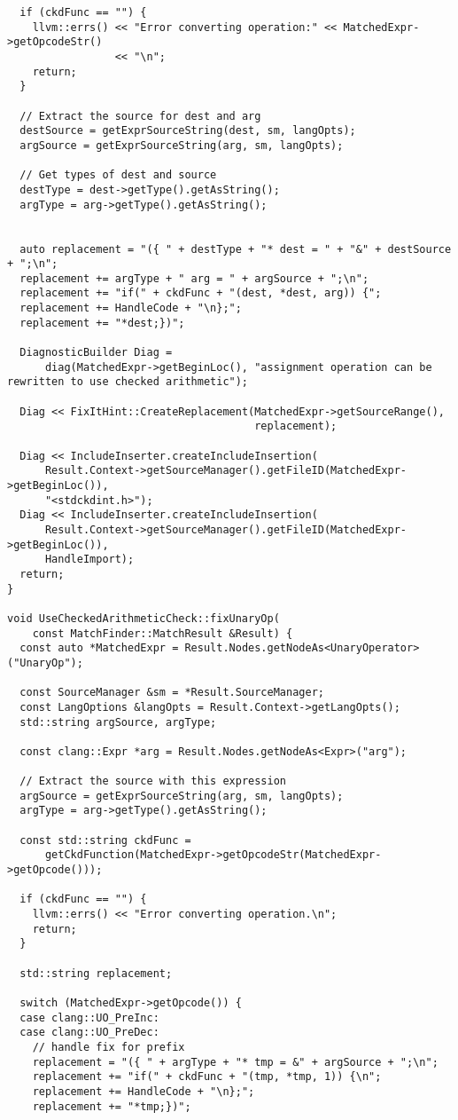 {\begin{verbatim}
  if (ckdFunc == "") {
    llvm::errs() << "Error converting operation:" << MatchedExpr->getOpcodeStr()
                 << "\n";
    return;
  }

  // Extract the source for dest and arg
  destSource = getExprSourceString(dest, sm, langOpts);
  argSource = getExprSourceString(arg, sm, langOpts);

  // Get types of dest and source
  destType = dest->getType().getAsString();
  argType = arg->getType().getAsString();


  auto replacement = "({ " + destType + "* dest = " + "&" + destSource + ";\n";
  replacement += argType + " arg = " + argSource + ";\n";
  replacement += "if(" + ckdFunc + "(dest, *dest, arg)) {";
  replacement += HandleCode + "\n};";
  replacement += "*dest;})";

  DiagnosticBuilder Diag =
      diag(MatchedExpr->getBeginLoc(), "assignment operation can be rewritten to use checked arithmetic");

  Diag << FixItHint::CreateReplacement(MatchedExpr->getSourceRange(),
                                       replacement);

  Diag << IncludeInserter.createIncludeInsertion(
      Result.Context->getSourceManager().getFileID(MatchedExpr->getBeginLoc()),
      "<stdckdint.h>");
  Diag << IncludeInserter.createIncludeInsertion(
      Result.Context->getSourceManager().getFileID(MatchedExpr->getBeginLoc()),
      HandleImport);
  return;
}

void UseCheckedArithmeticCheck::fixUnaryOp(
    const MatchFinder::MatchResult &Result) {
  const auto *MatchedExpr = Result.Nodes.getNodeAs<UnaryOperator>("UnaryOp");

  const SourceManager &sm = *Result.SourceManager;
  const LangOptions &langOpts = Result.Context->getLangOpts();
  std::string argSource, argType;

  const clang::Expr *arg = Result.Nodes.getNodeAs<Expr>("arg");

  // Extract the source with this expression
  argSource = getExprSourceString(arg, sm, langOpts);
  argType = arg->getType().getAsString();

  const std::string ckdFunc =
      getCkdFunction(MatchedExpr->getOpcodeStr(MatchedExpr->getOpcode()));

  if (ckdFunc == "") {
    llvm::errs() << "Error converting operation.\n";
    return;
  }

  std::string replacement;

  switch (MatchedExpr->getOpcode()) {
  case clang::UO_PreInc:
  case clang::UO_PreDec:
    // handle fix for prefix
    replacement = "({ " + argType + "* tmp = &" + argSource + ";\n";
    replacement += "if(" + ckdFunc + "(tmp, *tmp, 1)) {\n";
    replacement += HandleCode + "\n};";
    replacement += "*tmp;})";


\end{verbatim}}
